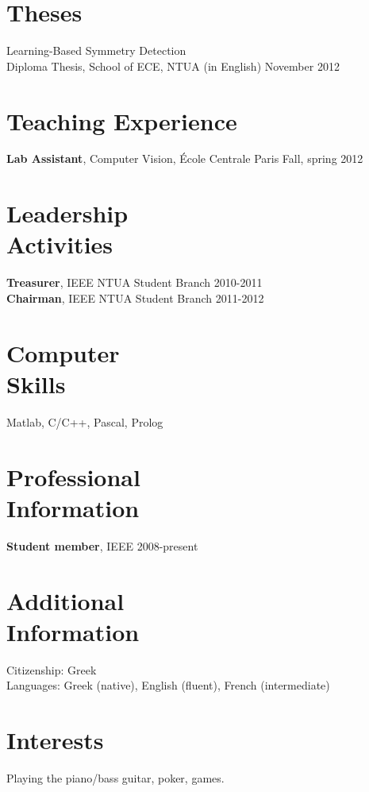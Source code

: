 \documentclass[margin]{res}
\begin{document}
\begin{resume}
\section{Theses}
Learning-Based Symmetry Detection\\
Diploma Thesis, School of ECE, NTUA (in English) \hfill November 2012


\section{Teaching Experience}
\textbf{Lab Assistant}, Computer Vision, \'Ecole Centrale Paris \hfill Fall, spring 2012
\\


\section{Leadership \\ Activities} 
\textbf{Treasurer}, IEEE NTUA Student Branch \hfill 2010-2011\\
\textbf{Chairman}, IEEE NTUA Student Branch \hfill 2011-2012
\\

\section{Computer \\ Skills} Matlab, C/C++, Pascal, Prolog
\\

\section{Professional \\ Information}
\textbf{Student member}, IEEE \hfill 2008-present
\\

\section{Additional \\ Information}
Citizenship: Greek \\
Languages: Greek (native), English (fluent), French (intermediate)

\section{Interests}
Playing the piano/bass guitar, poker, games.

\end{resume} 
\end{document}
